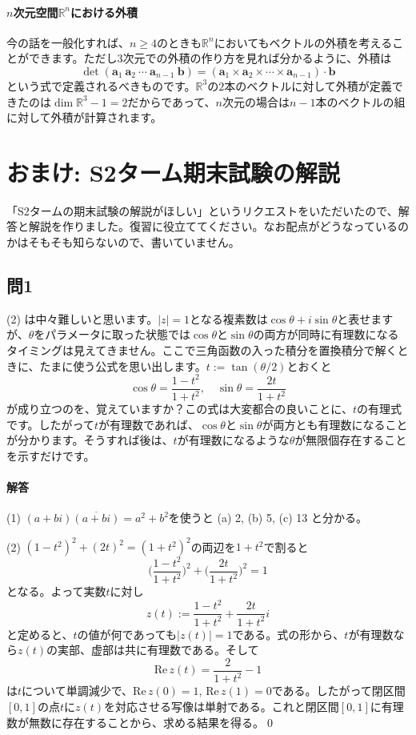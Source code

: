\paragraph{$n$次元空間$\mathbb{R}^n$における外積}

今の話を一般化すれば、$n \geq 4$のときも$\mathbb{R}^n$においてもベクトルの外積を考えることができます。ただし$3$次元での外積の作り方を見れば分かるように、外積は
\[
\det(\bm{a}_1 \  \bm{a}_2 \  \cdots \ \bm{a}_{n - 1} \  \bm{b}) = (\bm{a}_1 \times \bm{a}_2 \times \cdots \times \bm{a}_{n - 1}) \cdot  \bm{b}
\]
という式で定義されるべきものです。$\mathbb{R}^3$の$2$本のベクトルに対して外積が定義できたのは$\dim \mathbb{R}^3 - 1 = 2$だからであって、$n$次元の場合は$n - 1$本のベクトルの組に対して外積が計算されます。

\section{おまけ: S2ターム期末試験の解説}

「S2タームの期末試験の解説がほしい」というリクエストをいただいたので、解答と解説を作りました。復習に役立ててください。なお配点がどうなっているのかはそもそも知らないので、書いていません。

\subsection{問1}

(2) は中々難しいと思います。$|z| = 1$となる複素数は$\cos\theta + i \sin\theta$と表せますが、$\theta$をパラメータに取った状態では$\cos \theta$と$\sin \theta$の両方が同時に有理数になるタイミングは見えてきません。ここで三角函数の入った積分を置換積分で解くときに、たまに使う公式を思い出します。$t := \tan (\theta/2)$とおくと
\[
\cos \theta = \frac{1 - t^2}{1 + t^2}, \quad \sin \theta = \frac{2t}{1 + t^2}
\]
が成り立つのを、覚えていますか？この式は大変都合の良いことに、$t$の有理式です。したがって$t$が有理数であれば、$\cos \theta$と$\sin \theta$が両方とも有理数になることが分かります。そうすれば後は、$t$が有理数になるような$\theta$が無限個存在することを示すだけです。

\paragraph{解答}
\noindent (1) $(a + bi)\overline{(a + bi)} = a^2 + b^2$を使うと (a) 2, (b) 5, (c) 13 と分かる。

\noindent (2) $(1 - t^2)^2 + (2t)^2 = (1 + t^2)^2$の両辺を$1 + t^2$で割ると
\[
\biggl(\frac{1 - t^2}{1 + t^2}\biggr)^2 + \biggl(\frac{2t}{1 + t^2}\biggr)^2 = 1
\]
となる。よって実数$t$に対し
\[
z(t) := \frac{1 - t^2}{1 + t^2} + \frac{2t}{1 + t^2}i
\]
と定めると、$t$の値が何であっても$|z(t)| = 1$である。式の形から、$t$が有理数なら$z(t)$の実部、虚部は共に有理数である。そして
\[
\mathrm{Re}\, z(t) = \frac{2}{1 + t^2} - 1
\]
は$t$について単調減少で、$\mathrm{Re}\, z(0) = 1$, $\mathrm{Re}\, z(1) = 0$である。したがって閉区間$[0, 1]$の点$t$に$z(t)$を対応させる写像は単射である。これと閉区間$[0, 1]$に有理数が無数に存在することから、求める結果を得る。\qed

